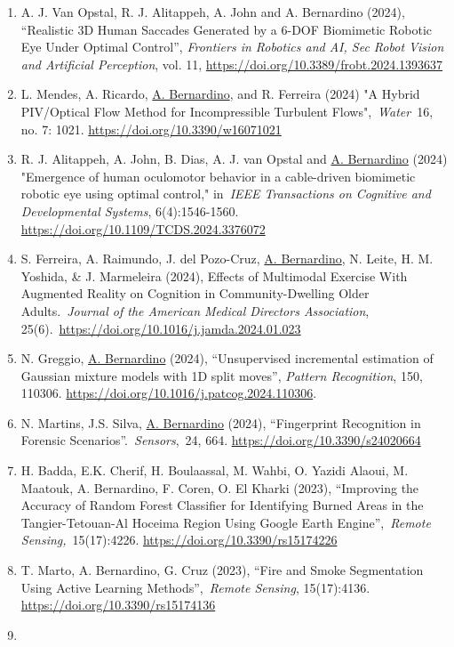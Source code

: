 \begin{enumerate}
  \url{https://doi.org/10.1007/s12369-024-01128-y}
\item
  A. J. Van Opstal, R. J. Alitappeh, A. John and A. Bernardino (2024),
  ``Realistic 3D Human Saccades Generated by a 6-DOF Biomimetic Robotic
  Eye Under Optimal Control'', \emph{Frontiers in Robotics and AI, Sec
  Robot Vision and Artificial Perception}, vol. 11,
  \url{https://doi.org/10.3389/frobt.2024.1393637}
\item
  L. Mendes, A. Ricardo, \ul{A. Bernardino}, and R. Ferreira (2024) "A
  Hybrid PIV/Optical Flow Method for Incompressible Turbulent
  Flows",~\emph{Water}~16, no. 7: 1021.
  \url{https://doi.org/10.3390/w16071021}
\item
  R. J. Alitappeh, A. John, B. Dias, A. J. van Opstal and \ul{A.
  Bernardino} (2024) "Emergence of human oculomotor behavior in a
  cable-driven biomimetic robotic eye using optimal control,"
  in~\emph{IEEE Transactions on Cognitive and Developmental Systems},
  6(4):1546-1560. \url{https://doi.org/10.1109/TCDS.2024.3376072}
\item
  S. Ferreira, A. Raimundo, J. del Pozo-Cruz, \ul{A. Bernardino}, N.
  Leite, H. M. Yoshida, \& J. Marmeleira (2024), Effects of Multimodal
  Exercise With Augmented Reality on Cognition in Community-Dwelling
  Older Adults.~\emph{Journal of the American Medical Directors
  Association}, 25(6).~\url{https://doi.org/10.1016/j.jamda.2024.01.023}
\item
  N. Greggio, \ul{A. Bernardino} (2024), ``Unsupervised incremental
  estimation of Gaussian mixture models with 1D split moves'',
  \emph{Pattern Recognition}, 150, 110306.
  \url{https://doi.org/10.1016/j.patcog.2024.110306}.
\item
  N. Martins, J.S. Silva, \ul{A. Bernardino} (2024), ``Fingerprint
  Recognition in Forensic Scenarios''.~\emph{Sensors},~24, 664.
  \url{https://doi.org/10.3390/s24020664}
\item
  H. Badda, E.K. Cherif, H. Boulaassal, M. Wahbi, O. Yazidi Alaoui, M.
  Maatouk, A. Bernardino, F. Coren, O. El Kharki (2023), ``Improving the
  Accuracy of Random Forest Classifier for Identifying Burned Areas in
  the Tangier-Tetouan-Al Hoceima Region Using Google Earth
  Engine'',~\emph{Remote Sensing,}~15(17):4226.
  \url{https://doi.org/10.3390/rs15174226}
\item
  T. Marto, A. Bernardino, G. Cruz (2023), ``Fire and Smoke Segmentation
  Using Active Learning Methods'',~\emph{Remote Sensing}, 15(17):4136.
  \url{https://doi.org/10.3390/rs15174136}
\item

\end{enumerate}
